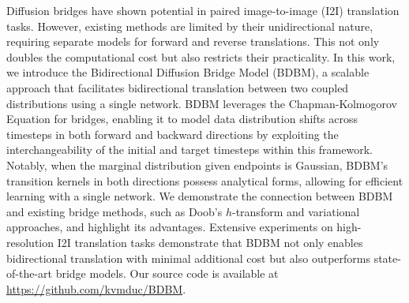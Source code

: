 Diffusion bridges have shown potential in paired image-to-image
(I2I) translation tasks. However, existing methods are limited by
their unidirectional nature, requiring separate models for forward
and reverse translations. This not only doubles the computational
cost but also restricts their practicality. In this work, we introduce
the Bidirectional Diffusion Bridge Model (BDBM), a scalable approach
that facilitates bidirectional translation between two coupled distributions
using a single network. BDBM leverages the Chapman-Kolmogorov Equation
for bridges, enabling it to model data distribution shifts across
timesteps in both forward and backward directions by exploiting the
interchangeability of the initial and target timesteps within this
framework. Notably, when the marginal distribution given endpoints
is Gaussian, BDBM's transition kernels in both directions possess
analytical forms, allowing for efficient learning with a single network.
We demonstrate the connection between BDBM and existing bridge methods,
such as Doob\textquoteright s $h$-transform and variational approaches,
and highlight its advantages. Extensive experiments on high-resolution
I2I translation tasks demonstrate that BDBM not only enables bidirectional
translation with minimal additional cost but also outperforms state-of-the-art
bridge models. Our source code is available at \href{https://github.com/kvmduc/BDBM}{https://github.com/kvmduc/BDBM}.

